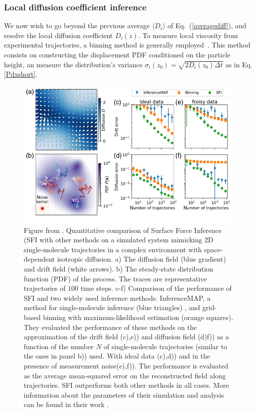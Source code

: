 \subsubsection{Local diffusion coefficient inference}

We now wish to go beyond the previous average $\langle D_i\rangle$ of Eq.~(\ref{averagediff}), and resolve the local diffusion coefficient $D_i(z)$. To measure local viscosity from experimental trajectories, a binning method is generally employed~\cite{friedrich_approaching_2011}. This method consists on constructing the displacement \gls{PDF} conditioned on the particle height, an measure the distribution's variance $\sigma_i(z_0) = \sqrt{2D_i (z_0) \Delta t}$ as in Eq.\ref{Pdxshort}. 


\begin{figure}[h!]
	\centering
	\includegraphics[scale=0.6]{02_body/chapter3/images/diffusion_coefficient/figure_Ronceray.png}
	\caption{Figure from \cite{frishman_learning_2020}. Quantitative comparison of Surface Force Inference (\gls{SFI} with other methods on a simulated system mimicking 2D single-molecule trajectories in a complex environment with space-dependent isotropic diffusion. a) The diffusion field (blue gradient) and drift field (white arrows). b) The steady-state distribution function (\gls{PDF}) of the process. The traces are representative trajectories of $100$ time steps. c-f) Comparison of the performance of \gls{SFI} and two widely used inference methods: InferenceMAP, a method for single-molecule inference (blue triangles)  \cite{beheiry_inferencemap_2015}, and grid-based binning with maximum-likelihood estimation \cite{hoze_heterogeneity_2012, friedrich_approaching_2011} (orange squares). They evaluated the performance of these methods on the approximation of the drift field (c),e)) and diffusion field (d)f)) as a function of the number $N$ of single-molecule trajectories (similar to the ones in panel b)) used. With ideal data (c),d)) and in the presence of measurement noise(e),f)). The performance is evaluated as the average mean-squared error on the reconstructed field along trajectories. \gls{SFI} outperforms both other methods in all cases. More information about the parameters of their simulation and analysis can be found in their work \cite{frishman_learning_2020}.}
	\label{fig.ronceray}
\end{figure}

